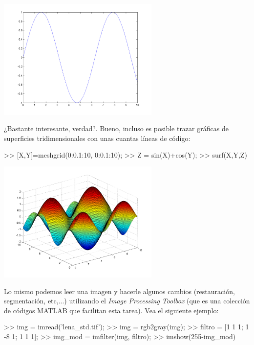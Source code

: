 \begin{center}
\includegraphics[width=0.6\textwidth]{src/img/ch1/img_1_3.png}
\label{fig:gla1}
\end{center}

¿Bastante interesante, verdad?. Bueno, incluso es posible trazar
gráficas de superficies tridimensionales con unas cuantas líneas de
código:

\begin{matlab}
>> [X,Y]=meshgrid(0:0.1:10, 0:0.1:10);
>> Z = sin(X)+cos(Y);
>> surf(X,Y,Z)
\end{matlab}

\begin{center}
\includegraphics[width=0.6\textwidth]{src/img/ch1/img_1_4.png}
\label{fig:xxxx}
\end{center}

Lo mismo podemos leer una imagen y hacerle algunos cambios
(restauración, segmentación, etc,...) utilizando el \emph{Image
Processing Toolbox} (que es una colección de códigos MATLAB que
facilitan esta tarea). Vea el siguiente ejemplo:

\begin{matlab}
>> img = imread('lena_std.tif');
>> img = rgb2gray(img);
>> filtro = [1 1 1; 1 -8 1; 1 1 1];
>> img_mod = imfilter(img, filtro);
>> imshow(255-img_mod)
\end{matlab}

